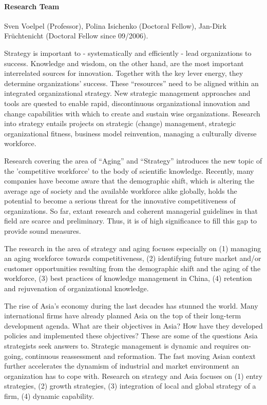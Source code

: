 
\paragraph{Research Team}
Sven Voelpel (Professor), Polina Isichenko (Doctoral Fellow), Jan-Dirk Fr\"uchtenicht (Doctoral Fellow since 09/2006).

Strategy is important to - systematically and efficiently - lead organizations to success. Knowledge and wisdom, on the other hand, are the most important interrelated sources for innovation. Together with the key lever energy, they determine organizations' success. These ``resources'' need to be aligned within an integrated organizational strategy. New strategic management approaches and tools are quested to enable rapid, discontinuous organizational innovation and change capabilities with which to create and sustain wise organizations. Research into strategy entails projects on strategic (change) management, strategic organizational fitness, business model reinvention, managing a culturally diverse workforce.

 Research covering the area of ``Aging'' and ``Strategy'' introduces the new topic of the 'competitive workforce' to the body of scientific knowledge. Recently, many companies have become aware that the demographic shift, which is altering the average age of society and the available workforce alike globally, holds the potential to become a serious threat for the innovative competitiveness of organizations. So far, extant research and coherent managerial guidelines in that field are scarce and preliminary. Thus, it is of high significance to fill this gap to provide sound measures.
 
 The research in the area of strategy and aging focuses especially on (1) managing an aging workforce towards competitiveness, (2) identifying future market and/or customer opportunities resulting from the demographic shift and the aging of the workforce, (3) best practices of knowledge management in China, (4) retention and rejuvenation of organizational knowledge.

 The rise of Asia's economy during the last decades has stunned the world. Many international firms have already planned Asia on the top of their long-term development agenda. What are their objectives in Asia? How have they developed policies and implemented these objectives? These are some of the questions Asia strategists seek answers to. Strategic management is dynamic and requires on-going, continuous reassessment and reformation. The fast moving Asian context further accelerates the dynamism of industrial and market environment an organization has to cope with. Research on strategy and Asia focuses on (1) entry strategies, (2) growth strategies, (3) integration of local and global strategy of a firm, (4) dynamic capability.

